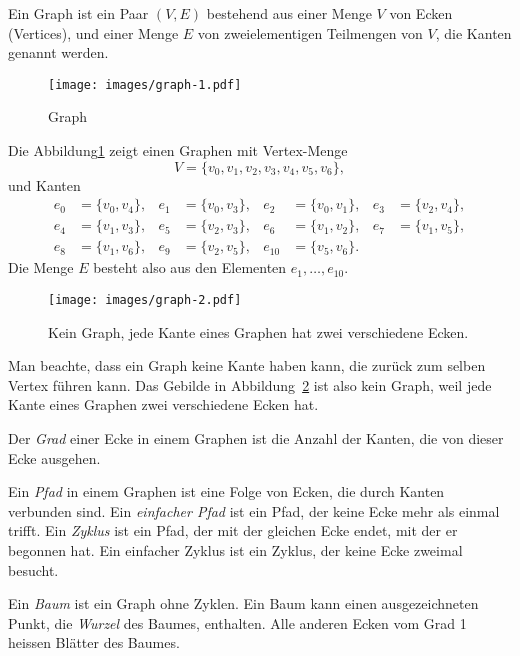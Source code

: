 \begin{definition}
%
\label{def_graph}
Ein Graph ist ein Paar $(V,E)$ bestehend aus einer Menge $V$ von Ecken
(Vertices),
und einer Menge $E$ von zweielementigen Teilmengen von $V$, die Kanten
genannt werden.
\end{definition}

\begin{figure}
\begin{center}
\texttt{[image: images/graph-1.pdf]}
\end{center}
\caption{Graph\label{grundlagen:graph}}
\end{figure}
Die Abbildung\ref{grundlagen:graph} zeigt einen Graphen mit Vertex-Menge
\[
V=\{v_0,
v_1,
v_2,
v_3,
v_4,
v_5,
v_6\},
\]
und Kanten
\begin{align*}
e_0&=\{v_0,v_4\},&
e_1&=\{v_0,v_3\},&
e_2&=\{v_0,v_1\},&
e_3&=\{v_2,v_4\},
\\
e_4&=\{v_1,v_3\},&
e_5&=\{v_2,v_3\},&
e_6&=\{v_1,v_2\},&
e_7&=\{v_1,v_5\},
\\
e_8&=\{v_1,v_6\},&
e_9&=\{v_2,v_5\},&
e_{10}&=\{v_5,v_6\}.
\end{align*}
Die Menge $E$ besteht also aus den Elementen $e_1,\dots,e_{10}$.

\begin{figure}
\begin{center}
\texttt{[image: images/graph-2.pdf]}
\end{center}
\caption{Kein Graph, jede Kante eines Graphen hat zwei verschiedene
Ecken.\label{grundlagen:keingraph}}
\end{figure}
Man beachte, dass ein Graph keine Kante haben kann, die zurück zum 
selben Vertex führen kann.
Das Gebilde in Abbildung~\ref{grundlagen:keingraph}
ist also kein Graph, weil jede Kante eines Graphen zwei verschiedene
Ecken hat.

%
Der {\em Grad} einer Ecke in einem Graphen ist die Anzahl der Kanten,
die von dieser Ecke ausgehen.

%
Ein {\em Pfad} in einem Graphen ist eine Folge von Ecken, die durch Kanten
verbunden sind.
%
Ein {\em einfacher Pfad} ist ein Pfad, der keine Ecke mehr
als einmal trifft.
%
Ein {\em Zyklus} ist ein Pfad, der mit der gleichen Ecke
endet, mit der er begonnen hat.
%
Ein einfacher Zyklus ist ein Zyklus,
der keine Ecke zweimal besucht.

%
Ein {\em Baum} ist ein Graph ohne Zyklen.
Ein Baum kann einen ausgezeichneten
Punkt, die {\em Wurzel} des Baumes, enthalten.
Alle anderen Ecken vom Grad 1
%
heissen Blätter des Baumes.

